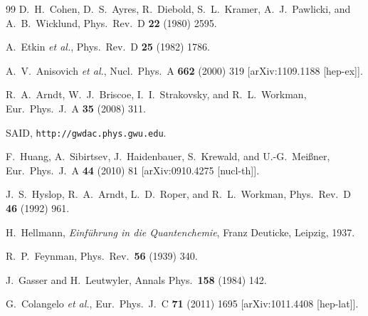 \documentclass[11pt]{article}%
\begin{document}
\begin{thebibliography}{99}
  D.~H.~Cohen, D.~S.~Ayres, R.~Diebold, S.~L.~Kramer, A.~J.~Pawlicki, and A.~B.~Wicklund,
  Phys.\ Rev.\  D {\bf 22} (1980) 2595.

  A.~Etkin {\it et al.},
  Phys.\ Rev.\  D {\bf 25} (1982) 1786.

  A.~V.~Anisovich %
  {\it et al.},
  Nucl.\ Phys.\  A {\bf 662} (2000) 319
  [arXiv:1109.1188 [hep-ex]].

  R.~A.~Arndt, W.~J.~Briscoe, I.~I.~Strakovsky, and R.~L.~Workman,
  Eur.\ Phys.\ J.\ A {\bf 35} (2008) 311.

  SAID, {\tt http://gwdac.phys.gwu.edu}.

  F.~Huang, A.~Sibirtsev, J.~Haidenbauer, S.~Krewald, and U.-G.~Mei{\ss}ner,
  Eur.\ Phys.\ J.\  A {\bf 44} (2010)  81
  [arXiv:0910.4275 [nucl-th]].

  J.~S.~Hyslop, R.~A.~Arndt, L.~D.~Roper, and R.~L.~Workman,
  Phys.\ Rev.\  D {\bf 46} (1992) 961.

  H.~Hellmann, {\it Einf\"uhrung in die Quantenchemie}, Franz Deuticke, Leipzig, 1937.

  R.~P.~Feynman,
  Phys.\ Rev.\  {\bf 56} (1939) 340.

  J.~Gasser and H.~Leutwyler,
  Annals Phys.\  {\bf 158} (1984) 142.

  G.~Colangelo {\it et al.},
  Eur.\ Phys.\ J.\  C {\bf 71} (2011) 1695
  [arXiv:1011.4408 [hep-lat]].


\end{thebibliography}
\end{document}
